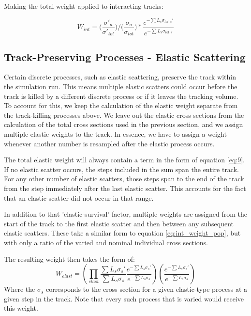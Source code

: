 \documentclass[12pt]{article}
\begin{document}
Making the total weight applied to interacting tracks:

\begin{equation}\label{eq:int_weight_pop}
  W_{int} = \big(\frac{\sigma'_a}{\sigma'_{tot}}\big)/\big(\frac{\sigma_a}{\sigma_{tot}}\big) * \frac{e^{-\sum L_s  \sigma_{tot,s}'}}{e^{-\sum L_s  \sigma_{tot,s}}}
\end{equation}

\subsection{Track-Preserving Processes - Elastic Scattering}
Certain discrete processes, such as elastic scattering, preserve the track within the simulation run. This means multiple elastic scatters could occur before the track is killed by a different discrete process or if it leaves the tracking volume. To account for this, we keep the calculation of the elastic weight separate from the track-killing processes above. We leave out the elastic cross sections from the calculation of the total cross sections used in the previous section, and we assign multiple elastic weights to the track. In essence, we have to assign a weight whenever another number is resampled after the elastic process occurs. 

The total elastic weight will always contain a term in the form of equation \ref{eq:9}. If no elastic scatter occurs, the steps included in the sum span the entire track. For any other number of elastic scatters, those steps span to the end of the track from the step immediately after the last elastic scatter. This accounts for the fact that an elastic scatter did not occur in that range. 

In addition to that 'elastic-survival' factor, multiple weights are assigned from the start of the track to the first elastic scatter and then between any subsequent elastic scatters. These take a similar form to equation \ref{eq:int_weight_pop}, but with only a ratio of the varied and nominal individual cross sections.

The resulting weight then takes the form of:
\begin{equation}\label{ref:elastFull}
W_{elast} = (\prod \limits_{elast} \frac{\sum L_s \sigma_s'}{\sum L_s \sigma_s} \frac{e^{-\sum L_s  \sigma_{s}'}}{e^{-\sum L_s  \sigma_{s}}})(\frac{e^{-\sum L_s \sigma_{s}'}}{e^{-\sum L_s \sigma_{s}}})
\end{equation}
Where the $\sigma_s$ corresponds to the cross section for a given elastic-type process at a given step in the track. Note that every such process that is varied would receive this weight.
\end{document}
